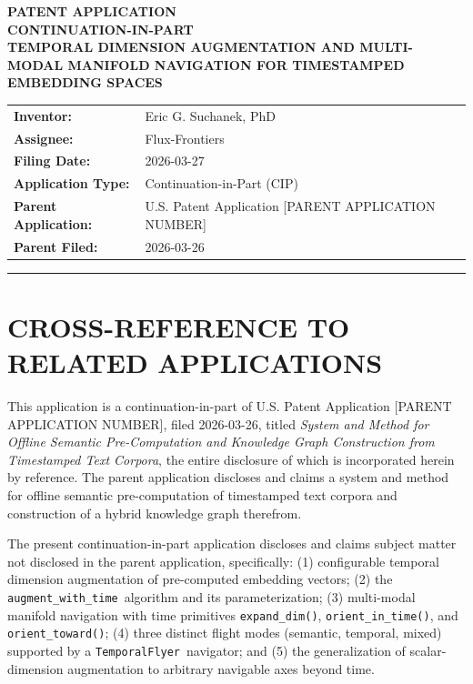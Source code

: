 \documentclass[12pt,letterpaper]{article}
\newcommand{\parentapp}{U.S. Patent Application [PARENT APPLICATION NUMBER]}
\newcommand{\parenttitle}{\emph{System and Method for Offline Semantic
Pre-Computation and Knowledge Graph Construction from Timestamped Text Corpora}}
\newcommand{\temporalflyer}{\texttt{TemporalFlyer}}
\newcommand{\augtime}{\texttt{augment\_with\_time}}
\newcommand{\expanddim}{\texttt{expand\_dim()}}
\newcommand{\orientintime}{\texttt{orient\_in\_time()}}
\newcommand{\orienttoward}{\texttt{orient\_toward()}}
\begin{document}

\begin{center}
  {\LARGE\bfseries PATENT APPLICATION}\\[0.5em]
  {\Large\bfseries CONTINUATION-IN-PART}\\[1.5em]
  {\large\bfseries TEMPORAL DIMENSION AUGMENTATION AND MULTI-MODAL MANIFOLD
  NAVIGATION FOR TIMESTAMPED EMBEDDING SPACES}\\[2em]
  \begin{tabular}{ll}
    \textbf{Inventor:}        & Eric G. Suchanek, PhD \\
    \textbf{Assignee:}        & Flux-Frontiers \\
    \textbf{Filing Date:}     & 2026-03-27 \\
    \textbf{Application Type:} & Continuation-in-Part (CIP) \\
    \textbf{Parent Application:} & \parentapp \\
    \textbf{Parent Filed:}    & 2026-03-26 \\
  \end{tabular}
\end{center}

\vspace{1em}
\hrule
\vspace{2em}

\tableofcontents

\newpage

\section*{CROSS-REFERENCE TO RELATED APPLICATIONS}

This application is a continuation-in-part of \parentapp, filed 2026-03-26,
titled \parenttitle, the entire disclosure of which is incorporated herein by
reference. The parent application discloses and claims a system and method for
offline semantic pre-computation of timestamped text corpora and construction of
a hybrid knowledge graph therefrom.

The present continuation-in-part application discloses and claims subject matter
not disclosed in the parent application, specifically: (1) configurable temporal
dimension augmentation of pre-computed embedding vectors; (2) the
\augtime\ algorithm and its parameterization; (3) multi-modal manifold navigation
with time primitives \expanddim, \orientintime, and \orienttoward; (4) three
distinct flight modes (semantic, temporal, mixed) supported by a
\temporalflyer\ navigator; and (5) the generalization of scalar-dimension
augmentation to arbitrary navigable axes beyond time.
\end{document}
